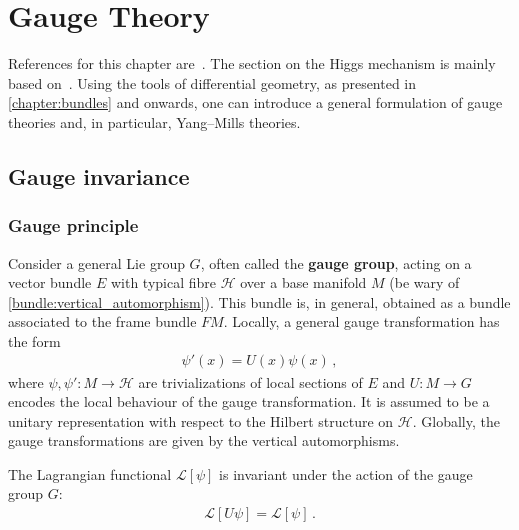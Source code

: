 \chapter{Gauge Theory}\label{chapter:gauge_theory}

    References for this chapter are~\citet{sontz_principal_2015,schuller_lectures_2016,nash_topology_2011,belgun_gauge_2024}. The section on the Higgs mechanism is mainly based on~\citet{choquet-bruhat_analysis_2000}. Using the tools of differential geometry, as presented in \cref{chapter:bundles} and onwards, one can introduce a general formulation of gauge theories and, in particular, Yang--Mills theories.

    \minitoc

\section{Gauge invariance}
\subsection{Gauge principle}

    Consider a general Lie group $G$, often called the \textbf{gauge group}, acting on a vector bundle $E$ with typical fibre $\mathcal{H}$ over a base manifold $M$ (be wary of \cref{bundle:vertical_automorphism}). This bundle is, in general, obtained as a bundle associated to the frame bundle $FM$. Locally, a general gauge transformation has the form
    \begin{gather}
        \label{gauge:gauge_transformation}
        \psi'(x) = U(x)\psi(x)\,,
    \end{gather}
    where $\psi,\psi':M\rightarrow\mathcal{H}$ are trivializations of local sections of $E$ and $U:M\rightarrow G$ encodes the local behaviour of the gauge transformation. It is assumed to be a unitary representation with respect to the Hilbert structure on $\mathcal{H}$. Globally, the gauge transformations are given by the vertical automorphisms.

    \begin{axiom}
        The Lagrangian functional $\mathcal{L}[\psi]$ is invariant under the action of the gauge group $G$:
        \begin{gather}
            \mathcal{L}[U\psi] = \mathcal{L}[\psi]\,.
        \end{gather}
    \end{axiom}

